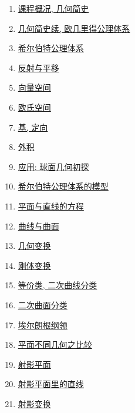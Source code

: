 \documentclass[11pt]{article}
\begin{document}
\begin{multicols}{2}
	\begin{enumerate}
		\item \href{https://mp.weixin.qq.com/s/eMWzqGr8L5K09U7eT9H8wg}{课程概况, 几何简史}	%
		\item \href{https://mp.weixin.qq.com/s/LpbpnJFbX-0bQUCQDb6iMA}{几何简史续, 欧几里得公理体系}	%
		\item \href{https://mp.weixin.qq.com/s/_tx57JHp7GVTrKZHpLkgqg}{希尔伯特公理体系}	%
		\item \href{https://mp.weixin.qq.com/s/fxpSPNuB0jrVLlVMGcYYxw}{反射与平移}	%
		\item \href{https://mp.weixin.qq.com/s/Vy4qh9BduTY0X6b2ZqZZ6g}{向量空间}	%
		\item \href{https://mp.weixin.qq.com/s/Td3_DvXz91UlVmv_bAw8Vw}{欧氏空间}	%
		\item \href{https://mp.weixin.qq.com/s/G28TEFlq845UVeyQHcpM1Q}{基, 定向}	%
		\item \href{https://mp.weixin.qq.com/s/I6P7lMgbSoJief9u8Orhvg}{外积}	%
		\item \href{https://mp.weixin.qq.com/s/3KMq71qte0Gxhi1_p5Hdng}{应用: 球面几何初探}	%
		\item \href{https://mp.weixin.qq.com/s/Vt9vlWZfYTH1eeMCjBpoLg}{希尔伯特公理体系的模型}	%
		\item \href{https://mp.weixin.qq.com/s/6w9-m4IL0hlkMSlQBztZDA}{平面与直线的方程}	%
		\item \href{https://mp.weixin.qq.com/s/7kCTabCGba_Ss64MRQpEjA}{曲线与曲面}	%
		\item \href{https://mp.weixin.qq.com/s/Z9LOUQegV2CUYkuD15IE-Q}{几何变换}	%
		\item \href{https://mp.weixin.qq.com/s/JJCOBGIKbEYW9dntj5IUhw}{刚体变换}	%
		\item \href{https://mp.weixin.qq.com/s/w6U0lwQDKqFccF9vF3B5ow}{等价类, 二次曲线分类}	%
		\item \href{https://mp.weixin.qq.com/s/-1zWLh4Ik6fq94gcJv6Z_A}{二次曲面分类}	%
		\item \href{https://mp.weixin.qq.com/s/-1zWLh4Ik6fq94gcJv6Z_A}{埃尔朗根纲领}	%
		\item \href{https://mp.weixin.qq.com/s/AUV6LxdNBgEvMOzmyMxiBg}{平面不同几何之比较}	%
		\item \href{https://mp.weixin.qq.com/s/A8eZB2NUvMhsJ4yXA9dFoQ}{射影平面}	%
		\item \href{https://mp.weixin.qq.com/s/yXKBvb2sq5r56jdqbbivlw}{射影平面里的直线}	%
		\item \href{https://mp.weixin.qq.com/s/x0MySIH7VtX65zYAyBr1fQ}{射影变换}	%

\end{enumerate}
\end{multicols}
\end{document}
